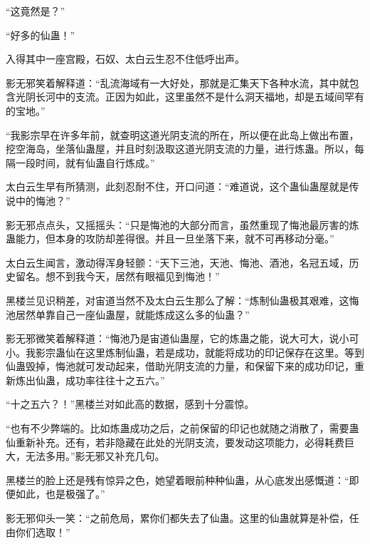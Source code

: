 \begin{this_body}
“这竟然是？”

“好多的仙蛊！”

入得其中一座宫殿，石奴、太白云生忍不住低呼出声。

影无邪笑着解释道：“乱流海域有一大好处，那就是汇集天下各种水流，其中就包含光阴长河中的支流。正因为如此，这里虽然不是什么洞天福地，却是五域间罕有的宝地。”

“我影宗早在许多年前，就查明这道光阴支流的所在，所以便在此岛上做出布置，挖空海岛，坐落仙蛊屋，并且时刻汲取这道光阴支流的力量，进行炼蛊。所以，每隔一段时间，就有仙蛊自行炼成。”

太白云生早有所猜测，此刻忍耐不住，开口问道：“难道说，这个蛊仙蛊屋就是传说中的悔池？”

影无邪点点头，又摇摇头：“只是悔池的大部分而言，虽然重现了悔池最厉害的炼蛊能力，但本身的攻防却差得很。并且一旦坐落下来，就不可再移动分毫。”

太白云生闻言，激动得浑身轻颤：“天下三池，天池、悔池、酒池，名冠五域，历史留名。想不到我今天，居然有眼福见到悔池！”

黑楼兰见识稍差，对宙道当然不及太白云生那么了解：“炼制仙蛊极其艰难，这悔池居然单靠自己一座仙蛊屋，就能炼成这么多的仙蛊？”

影无邪微笑着解释道：“悔池乃是宙道仙蛊屋，它的炼蛊之能，说大可大，说小可小。我影宗蛊仙在这里炼制仙蛊，若是成功，就能将成功的印记保存在这里。等到仙蛊毁掉，悔池就可发动起来，借助光阴支流的力量，和保留下来的成功印记，重新炼出仙蛊，成功率往往十之五六。”

“十之五六？！”黑楼兰对如此高的数据，感到十分震惊。

“也有不少弊端的。比如炼蛊成功之后，之前保留的印记也就随之消散了，需要蛊仙重新补充。还有，若非隐藏在此处的光阴支流，要发动这项能力，必得耗费巨大，无法多用。”影无邪又补充几句。

黑楼兰的脸上还是残有惊异之色，她望着眼前种种仙蛊，从心底发出感慨道：“即便如此，也是极强了。”

影无邪仰头一笑：“之前危局，累你们都失去了仙蛊。这里的仙蛊就算是补偿，任由你们选取！”

\end{this_body}

